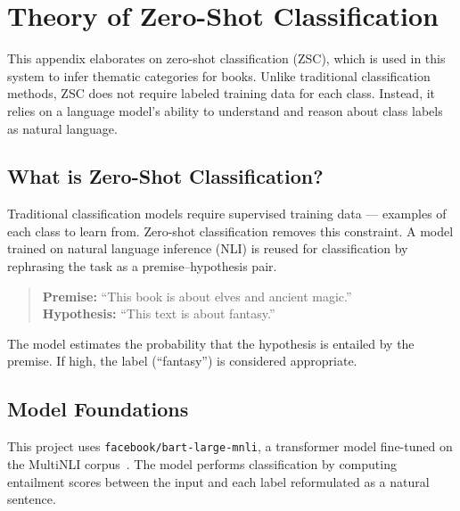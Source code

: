 \chapter{Theory of Zero-Shot Classification}
\label{appendix:zsc-theory}

This appendix elaborates on zero-shot classification (ZSC), which is used in this system to infer thematic categories for books. Unlike traditional classification methods, ZSC does not require labeled training data for each class. Instead, it relies on a language model’s ability to understand and reason about class labels as natural language.

\section{What is Zero-Shot Classification?}
Traditional classification models require supervised training data — examples of each class to learn from. Zero-shot classification removes this constraint. A model trained on natural language inference (NLI) is reused for classification by rephrasing the task as a premise–hypothesis pair.

\begin{quote}
\textbf{Premise:} “This book is about elves and ancient magic.” \\
\textbf{Hypothesis:} “This text is about fantasy.”
\end{quote}

The model estimates the probability that the hypothesis is entailed by the premise. If high, the label (“fantasy”) is considered appropriate.

\section{Model Foundations}
This project uses \texttt{facebook/bart-large-mnli}, a transformer model fine-tuned on the MultiNLI corpus~\parencite{williams2018broad}. The model performs classification by computing entailment scores between the input and each label reformulated as a natural sentence.

